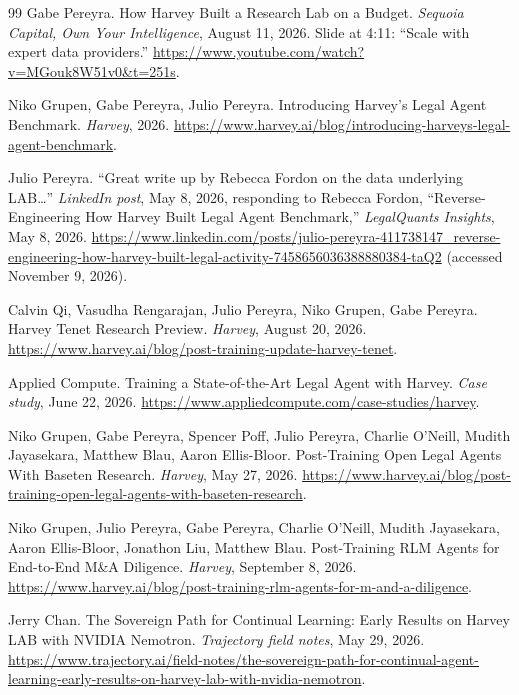 \documentclass[11pt]{article}
\begin{document}
\begin{thebibliography}{99}
 Gabe Pereyra. How Harvey Built a Research Lab on a Budget. \emph{Sequoia Capital, Own Your Intelligence}, August 11, 2026. Slide at 4:11: ``Scale with expert data providers.'' \url{https://www.youtube.com/watch?v=MGouk8W51v0\&t=251s}.

 Niko Grupen, Gabe Pereyra, Julio Pereyra. Introducing Harvey's Legal Agent Benchmark. \emph{Harvey}, 2026. \url{https://www.harvey.ai/blog/introducing-harveys-legal-agent-benchmark}.

 Julio Pereyra. ``Great write up by Rebecca Fordon on the data underlying LAB\ldots'' \emph{LinkedIn post}, May 8, 2026, responding to Rebecca Fordon, ``Reverse-Engineering How Harvey Built Legal Agent Benchmark,'' \emph{LegalQuants Insights}, May 8, 2026. \url{https://www.linkedin.com/posts/julio-pereyra-411738147_reverse-engineering-how-harvey-built-legal-activity-7458656036388880384-taQ2} (accessed November 9, 2026).

 Calvin Qi, Vasudha Rengarajan, Julio Pereyra, Niko Grupen, Gabe Pereyra. Harvey Tenet Research Preview. \emph{Harvey}, August 20, 2026. \url{https://www.harvey.ai/blog/post-training-update-harvey-tenet}.

 Applied Compute. Training a State-of-the-Art Legal Agent with Harvey. \emph{Case study}, June 22, 2026. \url{https://www.appliedcompute.com/case-studies/harvey}.

 Niko Grupen, Gabe Pereyra, Spencer Poff, Julio Pereyra, Charlie O'Neill, Mudith Jayasekara, Matthew Blau, Aaron Ellis-Bloor. Post-Training Open Legal Agents With Baseten Research. \emph{Harvey}, May 27, 2026. \url{https://www.harvey.ai/blog/post-training-open-legal-agents-with-baseten-research}.

 Niko Grupen, Julio Pereyra, Gabe Pereyra, Charlie O'Neill, Mudith Jayasekara, Aaron Ellis-Bloor, Jonathon Liu, Matthew Blau. Post-Training RLM Agents for End-to-End M\&A Diligence. \emph{Harvey}, September 8, 2026. \url{https://www.harvey.ai/blog/post-training-rlm-agents-for-m-and-a-diligence}.

 Jerry Chan. The Sovereign Path for Continual Learning: Early Results on Harvey LAB with NVIDIA Nemotron. \emph{Trajectory field notes}, May 29, 2026. \url{https://www.trajectory.ai/field-notes/the-sovereign-path-for-continual-agent-learning-early-results-on-harvey-lab-with-nvidia-nemotron}.


\end{thebibliography}
\end{document}
